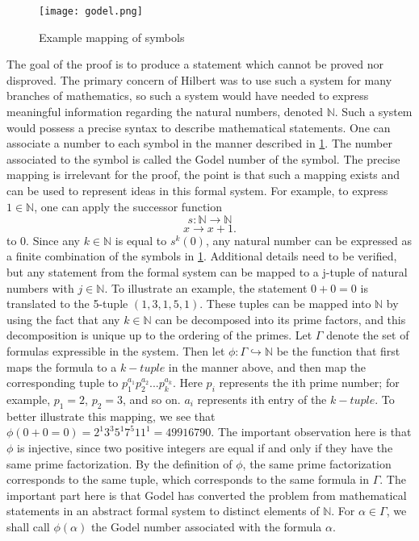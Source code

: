 \documentclass[%
 reprint,
 amsmath,amssymb,
 aps,
]{revtex4-2}
\begin{document}
\begin{figure}[H]
\centering
\texttt{[image: godel.png]}
\caption{Example mapping of symbols}
\label{fig:1}
\end{figure}
The goal of the proof is to produce a statement which cannot be proved nor disproved.  The primary concern of Hilbert was to use such a system for many branches of mathematics, so such a system would have needed to express meaningful information regarding the natural numbers, denoted $\mathbb{N}$.  Such a system would possess a precise syntax to describe mathematical statements.  One can associate a number to each symbol in the manner described in \ref{fig:1}.  The number associated to the symbol is called the Godel number of the symbol.  The precise mapping is irrelevant for the proof, the point is that such a mapping exists and can be used to represent ideas in this formal system.  For example, to express $1 \in \mathbb{N}$, one can apply the successor function $$ s: \mathbb{N} \xrightarrow{} \mathbb{N}$$ $$ x \xrightarrow{} x + 1.$$ to 0.  Since any $k \in \mathbb{N}$ is equal to $s^{k}(0)$, any natural number can be expressed as a finite combination of the symbols in \ref{fig:1}.  Additional details need to be verified, but any statement from the formal system can be mapped to a j-tuple of  natural numbers with $j \in \mathbb{N}$.  To illustrate an example, the statement $0 + 0 = 0$ is translated to the 5-tuple $(1,3,1,5,1)$.  These tuples can be mapped into $\mathbb{N}$ by using the fact that any $k \in \mathbb{N}$ can be decomposed into its prime factors, and this decomposition is unique up to the ordering of the primes.  Let $\Gamma$ denote the set of formulas expressible in the system.  Then let $\phi: \Gamma \hookrightarrow \mathbb{N}$ be the function that first maps the formula to a $k-tuple$ in the manner above, and then map the corresponding tuple to $p_{1}^{a_1}p_2^{a_2}...p_{k}^{a_k}$.  Here $p_i$ represents the ith prime number; for example, $p_1 = 2$, $p_2 = 3$, and so on.  $a_i$ represents ith entry of the $k-tuple$.  To better illustrate this mapping, we see that $\phi(0 + 0 = 0) = 2^{1}3^{3}5^{1}7^{5}11^{1} =49916790$.  The important observation here is that $\phi$ is injective, since two positive integers are equal if and only if they have the same prime factorization.  By the definition of $\phi$, the same prime factorization corresponds to the same tuple, which corresponds to the same formula in $\Gamma$.  The important part here is that Godel has converted the problem from mathematical statements in an abstract formal system to distinct elements of $\mathbb{N}$.  For $\alpha \in \Gamma$, we shall call $\phi(\alpha)$ the Godel number associated with the formula $\alpha$.   
\end{document}
